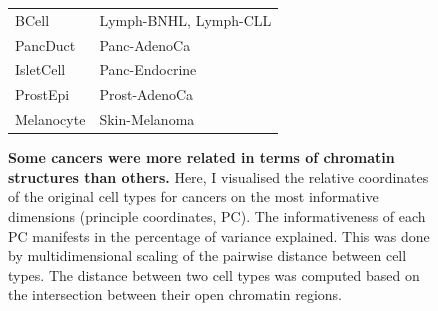 \begin{figure}[h!]
\begin{minipage}[c]{\textwidth}
\begin{tabulary}{\textwidth}{ ll }
    BCell & Lymph-BNHL, Lymph-CLL \\
    
    PancDuct & Panc-AdenoCa \\
    
    IsletCell & Panc-Endocrine \\
    
    ProstEpi & Prost-AdenoCa \\
    
    Melanocyte & Skin-Melanoma \\
    \bottomrule
    
    \end{tabulary}
    
  \end{minipage}\hfill
  \vspace{0.9cm}
  
  \begin{minipage}[c]{\textwidth}
    \caption{
      \textbf{Some cancers were more related in terms of chromatin structures than others.} Here, I visualised the relative coordinates of the original cell types for cancers on the most informative dimensions (principle coordinates, PC). The informativeness of each PC manifests in the percentage of variance explained. This was done by multidimensional scaling of the pairwise distance between cell types. The distance between two cell types was computed based on the intersection between their open chromatin regions. 
    } \label{fig:encode_pca}
  \end{minipage}
\end{figure}
